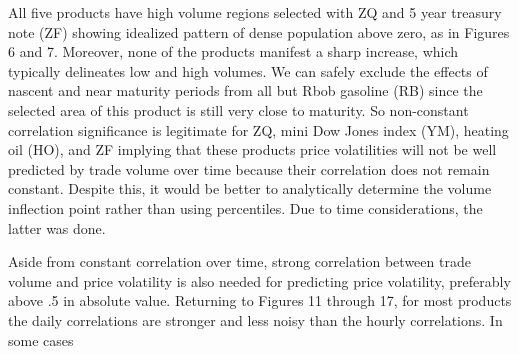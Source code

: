 \documentclass[12pt]{article}
\begin{document}
All five products have high volume regions selected with ZQ and 5 year treasury note (ZF) showing idealized pattern of dense population above zero, as in Figures 6 and 7. Moreover, none of the products manifest a sharp increase, which typically delineates low and high volumes. We can safely exclude the effects of nascent and near maturity periods from all but Rbob gasoline (RB) since the selected area of this product is still very close to maturity. So non-constant correlation significance is legitimate for ZQ, mini Dow Jones index (YM), heating oil (HO), and ZF implying that these products price volatilities will not be well predicted by trade volume over time because their correlation does not remain constant. Despite this, it would be better to analytically determine the volume inflection point rather than using percentiles. Due to time considerations, the latter was done.

Aside from constant correlation over time, strong correlation between trade volume and price volatility is also needed for predicting price volatility, preferably above .5 in absolute value. Returning to Figures 11 through 17, for most products the daily correlations are stronger and less noisy than the hourly correlations. In some cases 
\end{document}

